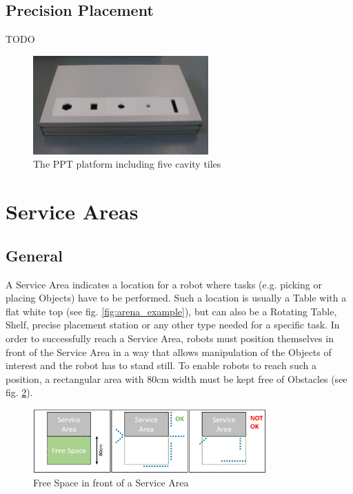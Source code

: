 \subsection{Precision Placement}\label{sec:Precision Placement}
TODO

\begin{figure}
	\centering
	\includegraphics[width=0.6\textwidth ]{./images/ppt_plattform.jpg}
	\caption{The PPT platform including five cavity tiles}
	\label{fig:ppt_plattform}
\end{figure}

\clearpage

\section{Service Areas}
\label{sec:Service_Areas}

\subsection{General} 
\label{subsec:Service_Areas_General}

A Service Area indicates a location for a robot where tasks (e.g. picking or placing Objects) have to be performed.
Such a location is usually a Table with a flat white top (see fig. \ref{fig:arena_example}), but can also be a Rotating Table, Shelf, precise placement station or any other type needed for a specific task.
In order to successfully reach a Service Area, robots must position themselves in front of the Service Area in a way that allows manipulation of the Objects of interest and the robot has to stand still. To enable robots to reach such a position, a rectangular area with $80\si{\centi\meter}$ width must be kept free of Obstacles (see fig. \ref{fig:arena_service_area_free}). 

\begin{figure} [h!]
	\centering
	\includegraphics[width= 0.8\textwidth ]{./images/general_rules/arena_service_area_free_space}
	\caption{Free Space in front of a Service Area}
	\label{fig:arena_service_area_free}
\end{figure}

